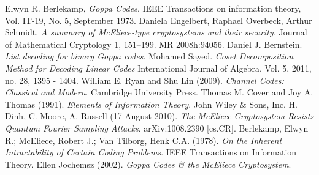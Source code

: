 \documentclass[12pt]{article}
\theoremstyle{definition}
\begin{document}
\begin{thebibliography}{9}

Elwyn R. Berlekamp, \emph{Goppa Codes}, IEEE Transactions on information theory, Vol. IT-19, No. 5, September 1973.
Daniela Engelbert, Raphael Overbeck, Arthur Schmidt. \emph{A summary of McEliece-type cryptosystems and their security.} Journal of Mathematical Cryptology 1, 151–199. MR 2008h:94056.
Daniel J. Bernstein. \emph{List decoding for binary Goppa codes}.
Mohamed Sayed. \emph{Coset Decomposition Method for Decoding Linear Codes} International Journal of Algebra, Vol. 5, 2011, no. 28, 1395 - 1404.
William E. Ryan and Shu Lin (2009). \emph{Channel Codes: Classical and Modern}. Cambridge University Press.
Thomas M. Cover and Joy A. Thomas (1991). \emph{Elements of Information Theory}. John Wiley & Sons, Inc. 
H. Dinh, C. Moore, A. Russell (17 August 2010). \emph{The McEliece Cryptosystem Resists Quantum Fourier Sampling Attacks}. arXiv:1008.2390 [cs.CR].
Berlekamp, Elwyn R.; McEliece, Robert J.; Van Tilborg, Henk C.A. (1978). \emph{On the Inherent Intractability of Certain Coding Problems}. IEEE Transactions on Information Theory.
Ellen Jochemsz (2002). \emph{Goppa Codes & the McEliece Cryptosystem}. 
\end{thebibliography}
\end{document}
